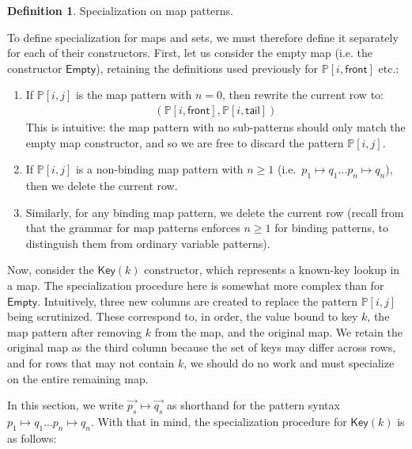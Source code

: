 \documentclass{article}
\theoremstyle{definition}
\newtheorem{definition}{Definition}[section]
\newcommand{\emptymap}{\mathsf{Empty}}
\newcommand{\mapkey}{\mathsf{Key}}
\newcommand{\PP}{\mathbb{P}}
\newcommand{\front}{\mathsf{front}}
\newcommand{\tail}{\mathsf{tail}}
\newcommand{\mapp}{\vec{p_s} \mapsto \vec{q_s}}
\begin{document}
\begin{definition}{Specialization on map patterns.}

To define specialization for maps and sets, we must therefore
define it separately for each of their constructors. First, let us
consider the empty map (i.e. the constructor $ \emptymap $), retaining the
definitions used previously for $ \PP[i, \front] $ etc.:

\begin{enumerate}

  \item If $ \PP[i, j] $ is the map pattern with $ n = 0 $, then rewrite the
    current row to:
    \begin{align*}
      (\PP[i, \front], \PP[i, \tail])
    \end{align*}
    This is intuitive: the map pattern with no sub-patterns should only match
    the empty map constructor, and so we are free to discard the pattern $
    \PP[i, j] $.

  \item If $ \PP[i, j] $ is a non-binding map pattern with $ n \geq 1 $ (i.e.\ $
    p_1 \mapsto q_1 \dots p_n \mapsto q_n $), then we delete the current row.

  \item Similarly, for any binding map pattern, we delete the current row
    (recall from  that the grammar for map patterns
    enforces $ n \geq 1 $ for binding patterns, to distinguish them from
    ordinary variable patterns).

\end{enumerate}

Now, consider the $ \mapkey(k) $ constructor, which represents a known-key
lookup in a map. The specialization procedure here is somewhat more complex
than for $ \emptymap $. Intuitively, three new columns are created to replace
the pattern $ \PP[i, j] $ being scrutinized. These correspond to, in order, the
value bound to key $ k $, the map pattern after removing $ k $ from the map, and
the original map. We retain the original map as the third column because the set
of keys may differ across rows, and for rows that may not contain $ k $, we
should do no work and must specialize on the entire remaining map.

In this section, we write $ \mapp $ as shorthand for the
pattern syntax $ p_1 \mapsto q_1 \dots p_n \mapsto q_n $. With that in
mind, the specialization procedure for $ \mapkey(k) $ is as follows:


\end{definition}
\end{document}
